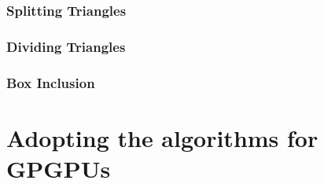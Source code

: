 


\subsubsection{Splitting Triangles}


\subsubsection{Dividing Triangles}




\subsubsection{Box Inclusion}












\section{Adopting the algorithms for GPGPUs}

